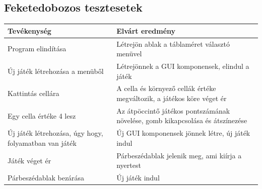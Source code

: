 \documentclass[a4paper,12pt]{article}
\begin{document}
	\subsection{Feketedobozos tesztesetek}
	\begin{tabularx}{\textwidth}{|Y|Y|}
		\hline
		Tevékenység & Elvárt eredmény \\
		\hline
		Program elindítása & Létrejön ablak a táblaméret választó menüvel \\
		\hline
		Új játék létrehozása a menüből & Létrejönnek a GUI komponensek, elindul a játék \\
		\hline
		Kattintás cellára & A cella és környező cellák értéke megváltozik, a játékos köre véget ér \\
		\hline
		Egy cella értéke 4 lesz & Az átpöccintő játékos pontszámának növelése, gomb kikapcsolása és átszínezése \\
		\hline
		Új játék létrehozása, úgy hogy, folyamatban van játék & Új GUI komponensek jönnek létre, új játék indul \\
		\hline
		Játék véget ér & Párbeszédablak jelenik meg, ami kiírja a nyertest \\
		\hline
		Párbeszédablak bezárása & Új játék indul \\
		\hline
	\end{tabularx}
\end{document}
